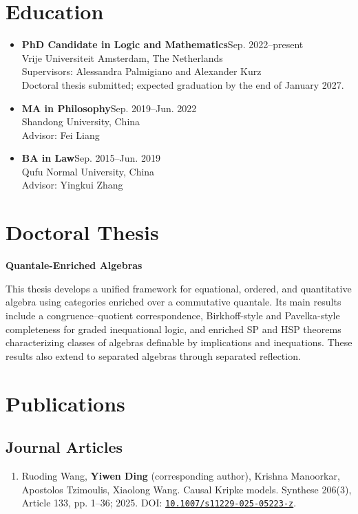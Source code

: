 \documentclass[11pt,a4paper]{article}
\begin{document}
\section*{Education}
\begin{itemize}
\item \textbf{PhD Candidate in Logic and Mathematics}\hfill Sep. 2022--present\\
Vrije Universiteit Amsterdam, The Netherlands\\
Supervisors: Alessandra Palmigiano and Alexander Kurz\\
Doctoral thesis submitted; expected graduation by the end of January 2027.
\item \textbf{MA in Philosophy}\hfill Sep. 2019--Jun. 2022\\
Shandong University, China\\
Advisor: Fei Liang
\item \textbf{BA in Law}\hfill Sep. 2015--Jun. 2019\\
Qufu Normal University, China\\
Advisor: Yingkui Zhang
\end{itemize}

\section*{Doctoral Thesis}
\textbf{Quantale-Enriched Algebras}\par
This thesis develops a unified framework for equational, ordered, and quantitative algebra using categories enriched over a commutative quantale. Its main results include a congruence--quotient correspondence, Birkhoff-style and Pavelka-style completeness for graded inequational logic, and enriched SP and HSP theorems characterizing classes of algebras definable by implications and inequations. These results also extend to separated algebras through separated reflection.

\section*{Publications}
\subsection*{Journal Articles}
\begin{enumerate}
\item Ruoding Wang, \textbf{Yiwen Ding} (corresponding author), Krishna Manoorkar, Apostolos Tzimoulis, Xiaolong Wang. Causal Kripke models. \textnormal{Synthese 206(3), Article 133, pp. 1--36; 2025}. DOI: \href{https://doi.org/10.1007/s11229-025-05223-z}{\nolinkurl{10.1007/s11229-025-05223-z}}.
\end{enumerate}
\end{document}
